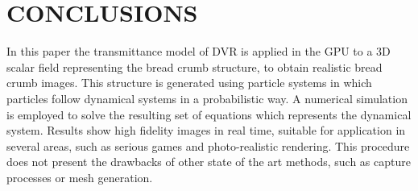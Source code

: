 \documentclass[oneside,a4paper,english,links]{amca}
\begin{document}




\section{CONCLUSIONS}

In this paper the transmittance model of DVR is applied in the GPU to a 3D scalar field representing the bread crumb structure, to obtain realistic bread crumb images. This structure is generated using particle systems in which particles follow dynamical systems in a probabilistic way. A numerical simulation is employed to solve the resulting set of equations which represents the dynamical system. Results show high fidelity images in real time, suitable for application in several areas, such as serious games \citep{Susi2007} and photo-realistic rendering. This procedure does not present the drawbacks of other state of the art methods, such as capture processes or mesh generation.
\end{document}
